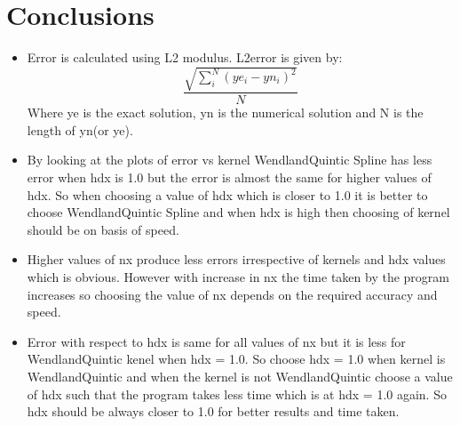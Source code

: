 \documentclass[12pt, a4paper]{report}
\begin{document}
\chapter{Conclusions}
\begin{itemize}
	\item Error is calculated using L2 modulus. L2error is given by:
	$$\frac{\sqrt{\sum_i^N\left(ye_i - yn_i \right)^2}}{N}$$
	Where ye is the exact solution, yn is the numerical solution and N is the length of yn(or ye).
	\item By looking at the plots of error vs kernel WendlandQuintic Spline has less error when hdx is 1.0 but the error is almost the same for higher values of hdx. So when choosing a value of hdx which is closer to 1.0 it is better to choose WendlandQuintic Spline and when hdx is high then choosing of kernel should be on basis of speed.
	\item Higher values of nx produce less errors irrespective of kernels and hdx values which is obvious. However with increase in nx the time taken by the program increases so choosing the value of nx depends on the required accuracy and speed. 
	\item Error with respect to hdx is same for all values of nx but it is less for WendlandQuintic kenel when hdx = 1.0. So choose hdx = 1.0 when kernel is WendlandQuintic and when the kernel is not WendlandQuintic choose a value of hdx such that the program takes less time which is at hdx = 1.0 again. So hdx should be always closer to 1.0 for better results and time taken.
\end{itemize}
\end{document}
